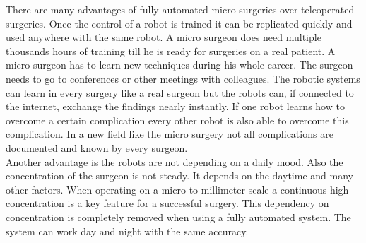 There are many advantages of fully automated micro surgeries over teleoperated surgeries. Once the control of a robot is trained it can be replicated quickly and used anywhere with the same robot. A micro surgeon does need multiple thousands hours of training till he is ready for surgeries on a real patient. A micro surgeon has to learn new techniques during his whole career. The surgeon needs to go to conferences or other meetings with colleagues. The robotic systems can learn in every surgery like a real surgeon but the robots can, if connected to the internet, exchange the findings nearly instantly. If one robot learns how to overcome a certain complication every other robot is also able to overcome this complication. In a new field like the micro surgery not all complications are documented and known by every surgeon.\\
Another advantage is the robots are not depending on a daily mood. Also the concentration of the surgeon is not steady. It depends on the daytime and many other factors. When operating on a micro to millimeter scale a continuous high concentration is a key feature for a successful surgery. This dependency on concentration is completely removed when using a fully automated system. The system can work day and night with the same accuracy.
